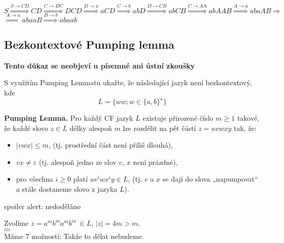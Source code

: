 $S \stackrel{S \rightarrow CD}{\Longrightarrow} CD \stackrel{C \rightarrow DC}{\Longrightarrow} DCD \stackrel
{D \rightarrow a}{\Longrightarrow} aCD \stackrel{C \rightarrow b}{\Longrightarrow} abD \stackrel{D \rightarrow CB}
{\Longrightarrow} abCB \stackrel{C \rightarrow AA}{\Longrightarrow} abAAB \stackrel{A \rightarrow a}{\Longrightarrow} 
abaAB \Longrightarrow $\\
$\stackrel{A \rightarrow a}{\Longrightarrow} abaaB \stackrel{B \rightarrow b}{\Longrightarrow} abaab$

\subsection{Bezkontextové Pumping lemma}
\textbf{Tento důkaz se neobjeví u písemné ani ústní zkoušky}

S využitím Pumping Lemmatu ukažte, že následující jazyk není bezkontextový, kde $$L = \{ww; w \in\{a,b\}^{\star}\}$$


\textbf{Pumping Lemma.} Pro každý CF jazyk $L$ existuje přirozené číslo $m \geq 1$ takové, že každé slovo $z \in L$ 
délky alespoň $m$ lze rozdělit na pět částí $z = uvwxy$ tak, že:

\begin{itemize}[label=\textbullet]
    \item $\lvert vwx \rvert \leq m$, (tj. prostřední část není příliš dlouhá),
    \item $vx \neq \varepsilon$ (tj. alespoň jedno ze slov $v$, $x$ není prázdné),
    \item pro všechna $i \geq 0$ platí $uv^i wx^i y \in L$, (tj. $v$ a $x$ se dají do slova „napumpovat“ a stále 
    dostaneme slovo z jazyka $L$).
\end{itemize}

spoiler alert: nedoděláno 

Zvolíme $z = a^m b^m a^m b^m \, \in L$, $|z| = 4m > m$. \\ 
$\dots$\\
$\dots$\\
$\dots$\\

Máme 7 možností: 
Takže to dělat nebudeme. 


